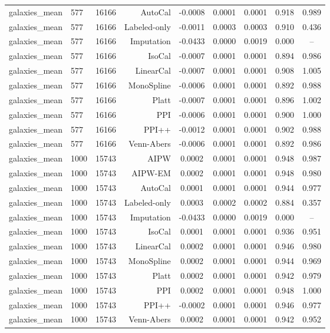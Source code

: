 \begin{tabular}{lllrccccc}
galaxies\_mean & 577 & 16166 & AutoCal & -0.0008 & 0.0001 & 0.0001 & 0.918 & 0.989 \\
galaxies\_mean & 577 & 16166 & Labeled-only & -0.0011 & 0.0003 & 0.0003 & 0.910 & 0.436 \\
galaxies\_mean & 577 & 16166 & Imputation & -0.0433 & 0.0000 & 0.0019 & 0.000 & -- \\
galaxies\_mean & 577 & 16166 & IsoCal & -0.0007 & 0.0001 & 0.0001 & 0.894 & 0.986 \\
galaxies\_mean & 577 & 16166 & LinearCal & -0.0007 & 0.0001 & 0.0001 & 0.908 & 1.005 \\
galaxies\_mean & 577 & 16166 & MonoSpline & -0.0006 & 0.0001 & 0.0001 & 0.892 & 0.988 \\
galaxies\_mean & 577 & 16166 & Platt & -0.0007 & 0.0001 & 0.0001 & 0.896 & 1.002 \\
galaxies\_mean & 577 & 16166 & PPI & -0.0006 & 0.0001 & 0.0001 & 0.900 & 1.000 \\
galaxies\_mean & 577 & 16166 & PPI++ & -0.0012 & 0.0001 & 0.0001 & 0.902 & 0.988 \\
galaxies\_mean & 577 & 16166 & Venn-Abers & -0.0006 & 0.0001 & 0.0001 & 0.892 & 0.986 \\
galaxies\_mean & 1000 & 15743 & AIPW & 0.0002 & 0.0001 & 0.0001 & 0.948 & 0.987 \\
galaxies\_mean & 1000 & 15743 & AIPW-EM & 0.0002 & 0.0001 & 0.0001 & 0.948 & 0.980 \\
galaxies\_mean & 1000 & 15743 & AutoCal & 0.0001 & 0.0001 & 0.0001 & 0.944 & 0.977 \\
galaxies\_mean & 1000 & 15743 & Labeled-only & 0.0003 & 0.0002 & 0.0002 & 0.884 & 0.357 \\
galaxies\_mean & 1000 & 15743 & Imputation & -0.0433 & 0.0000 & 0.0019 & 0.000 & -- \\
galaxies\_mean & 1000 & 15743 & IsoCal & 0.0001 & 0.0001 & 0.0001 & 0.936 & 0.951 \\
galaxies\_mean & 1000 & 15743 & LinearCal & 0.0002 & 0.0001 & 0.0001 & 0.946 & 0.980 \\
galaxies\_mean & 1000 & 15743 & MonoSpline & 0.0002 & 0.0001 & 0.0001 & 0.944 & 0.969 \\
galaxies\_mean & 1000 & 15743 & Platt & 0.0002 & 0.0001 & 0.0001 & 0.942 & 0.979 \\
galaxies\_mean & 1000 & 15743 & PPI & 0.0002 & 0.0001 & 0.0001 & 0.948 & 1.000 \\
galaxies\_mean & 1000 & 15743 & PPI++ & -0.0002 & 0.0001 & 0.0001 & 0.946 & 0.977 \\
galaxies\_mean & 1000 & 15743 & Venn-Abers & 0.0002 & 0.0001 & 0.0001 & 0.942 & 0.952 \\
\bottomrule
\end{tabular}
